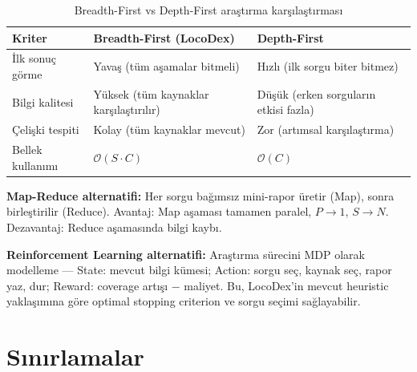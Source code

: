 \begin{table}[H]
\centering
\caption{Breadth-First vs Depth-First ara\c{s}t{\i}rma kar\c{s}{\i}la\c{s}t{\i}rmas{\i}}
\label{tab:bfs_vs_dfs}
\begin{tabularx}{\textwidth}{lXX}
\toprule
\color{chapterBlue}\textbf{Kriter} & \color{chapterBlue}\textbf{Breadth-First (LocoDex)} & \color{chapterBlue}\textbf{Depth-First} \\
\midrule
\.{I}lk sonu\c{c} g\"{o}rme    & Yava\c{s} (t\"{u}m a\c{s}amalar bitmeli)   & H{\i}zl{\i} (ilk sorgu biter bitmez) \\
Bilgi kalitesi       & Y\"{u}ksek (t\"{u}m kaynaklar kar\c{s}{\i}la\c{s}t{\i}r{\i}l{\i}r) & D\"{u}\c{s}\"{u}k (erken sorgular{\i}n etkisi fazla) \\
\c{C}eli\c{s}ki tespiti   & Kolay (t\"{u}m kaynaklar mevcut)       & Zor (art{\i}msal kar\c{s}{\i}la\c{s}t{\i}rma) \\
Bellek kullan{\i}m{\i}    & $\mathcal{O}(S \cdot C)$               & $\mathcal{O}(C)$ \\
\bottomrule
\end{tabularx}
\end{table}

\textbf{Map-Reduce alternatifi:} Her sorgu ba\u{g}{\i}ms{\i}z mini-rapor \"{u}retir (Map), sonra birle\c{s}tirilir (Reduce). Avantaj: Map a\c{s}amas{\i} tamamen paralel, $P \to 1$, $S \to N$. Dezavantaj: Reduce a\c{s}amas{\i}nda bilgi kayb{\i}.

\textbf{Reinforcement Learning alternatifi:} Ara\c{s}t{\i}rma s\"{u}recini MDP olarak modelleme --- State: mevcut bilgi k\"{u}mesi; Action: sorgu se\c{c}, kaynak se\c{c}, rapor yaz, dur; Reward: coverage art{\i}\c{s}{\i} $-$ maliyet. Bu, LocoDex'in mevcut heuristic yakla\c{s}{\i}m{\i}na g\"{o}re optimal stopping criterion ve sorgu se\c{c}imi sa\u{g}layabilir.


\section{S{\i}n{\i}rlamalar}
\label{sec:pipeline_limitations}


